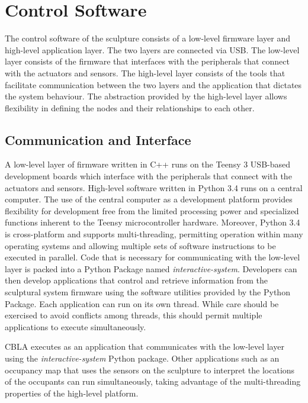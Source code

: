 \FloatBarrier
\section{Control Software}

The control software of the sculpture consists of a low-level firmware layer and high-level application layer. The two layers are connected via USB. The low-level layer consists of the firmware that interfaces with the peripherals that connect with the actuators and sensors. The high-level layer consists of the tools that facilitate communication between the two layers and the application that dictates the system behaviour. The abstraction provided by the high-level layer allows flexibility in defining the nodes and their relationships to each other. 

\subsection{Communication and Interface}

A low-level layer of firmware written in C++ runs on the Teensy 3 USB-based development boards which interface with the peripherals that connect with the actuators and sensors. High-level software written in Python 3.4 runs on a central computer. The use of the central computer as a development platform provides flexibility for development free from the limited processing power and specialized functions inherent to the Teensy microcontroller hardware. Moreover, Python 3.4 is cross-platform and supports multi-threading, permitting operation within many operating systems and allowing multiple sets of software instructions to be executed in parallel. Code that is necessary for communicating with the low-level layer is packed into a Python Package named \textit{interactive-system}. Developers can then develop applications that control and retrieve information from the sculptural system firmware using the software utilities provided by the Python Package. Each application can run on its own thread. While care should be exercised to avoid conflicts among threads, this should permit multiple applications to execute simultaneously.	

CBLA executes as an application that communicates with the low-level layer using the \textit{interactive-system} Python package. Other applications such as an occupancy map that uses the sensors on the sculpture to interpret the locations of the occupants can run simultaneously, taking advantage of the multi-threading properties of the high-level platform.


